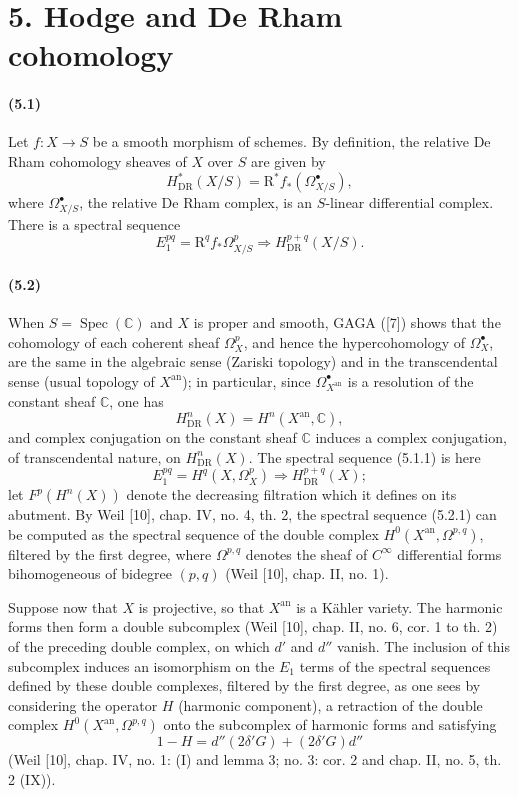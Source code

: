 \documentclass[10pt]{article}
\newcommand{\R}{\mathrm R}
\providecommand{\C}{\mathbb C}
\providecommand{\Spec}{\operatorname{Spec}}
\providecommand{\DR}{\operatorname{DR}}
\providecommand{\an}{\mathrm{an}}
\begin{document}
\section*{5. Hodge and De Rham cohomology}

\paragraph{(5.1)} Let $f:X\to S$ be a smooth morphism of schemes. By definition, the relative De Rham cohomology sheaves of $X$ over $S$ are given by
\[
H_{\DR}^*(X/S)=\R^*f_*(\Omega_{X/S}^\bullet),
\]
where $\Omega_{X/S}^\bullet$, the relative De Rham complex, is an $S$-linear differential complex. There is a spectral sequence
\[
\tag{5.1.1}
E_1^{pq}=\R^qf_*\Omega_{X/S}^p\Longrightarrow H_{\DR}^{p+q}(X/S).
\]

\paragraph{(5.2)} When $S=\Spec(\C)$ and $X$ is proper and smooth, GAGA ([7]) shows that the cohomology of each coherent sheaf $\Omega_X^p$, and hence the hypercohomology of $\Omega_X^\bullet$, are the same in the algebraic sense (Zariski topology) and in the transcendental sense (usual topology of $X^{\an}$); in particular, since $\Omega_{X^{\an}}^\bullet$ is a resolution of the constant sheaf $\C$, one has
\[
H_{\DR}^n(X)=H^n(X^{\an},\C),
\]
and complex conjugation on the constant sheaf $\C$ induces a complex conjugation, of transcendental nature, on $H_{\DR}^n(X)$. The spectral sequence (5.1.1) is here
\[
\tag{5.2.1}
E_1^{pq}=H^q(X,\Omega_X^p)\Longrightarrow H_{\DR}^{p+q}(X);
\]
let $F^p(H^n(X))$ denote the decreasing filtration which it defines on its abutment. By Weil [10], chap. IV, no. 4, th. 2, the spectral sequence (5.2.1) can be computed as the spectral sequence of the double complex $H^0(X^{\an},\Omega^{p,q})$, filtered by the first degree, where $\Omega^{p,q}$ denotes the sheaf of $C^\infty$ differential forms bihomogeneous of bidegree $(p,q)$ (Weil [10], chap. II, no. 1).

Suppose now that $X$ is projective, so that $X^{\an}$ is a Kähler variety. The harmonic forms then form a double subcomplex (Weil [10], chap. II, no. 6, cor. 1 to th. 2) of the preceding double complex, on which $d'$ and $d''$ vanish. The inclusion of this subcomplex induces an isomorphism on the $E_1$ terms of the spectral sequences defined by these double complexes, filtered by the first degree, as one sees by considering the operator $H$ (harmonic component), a retraction of the double complex $H^0(X^{\an},\Omega^{p,q})$ onto the subcomplex of harmonic forms and satisfying
\[
1-H=d''(2\delta'G)+(2\delta'G)d''
\]
(Weil [10], chap. IV, no. 1: (I) and lemma 3; no. 3: cor. 2 and chap. II, no. 5, th. 2 (IX)).
\end{document}

